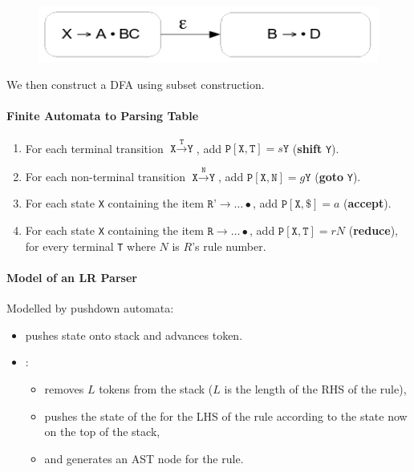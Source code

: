 \documentclass[twocolumn,english]{article}
\let\emph\relax
\begin{document}
\begin{figure}[H]
\centering{}\includegraphics[width=0.4\linewidth]{img/lr0tonfa-nonterminal}
\end{figure}

We then construct a DFA using subset construction.

\paragraph{Finite Automata to Parsing Table}
\begin{enumerate}
\item For each terminal transition $\texttt{X}\xrightarrow{\texttt{T}}\texttt{Y}$,
add $\texttt{P}[\texttt{X},\texttt{T}]=s\texttt{Y}$ (\textbf{shift}
\texttt{Y}).
\item For each non-terminal transition $\texttt{X}\xrightarrow{\texttt{N}}\texttt{Y}$,
add $\texttt{P}[\texttt{X},\texttt{N}]=g\texttt{Y}$ (\textbf{goto}
\texttt{Y}).
\item For each state \texttt{X} containing the item $\texttt{R'}\rightarrow\dots\bullet$,
add $\texttt{P}[\texttt{X},\texttt{\$}]=a$ (\textbf{accept}).
\item For each state \texttt{X} containing the item $\texttt{R}\rightarrow\dots\bullet$,
add $\texttt{P}[\texttt{X},\texttt{T}]=rN$ (\textbf{reduce}), for
every terminal \texttt{T} where $N$ is $R$'s rule number.
\end{enumerate}

\paragraph{Model of an LR Parser}

Modelled by pushdown automata:
\begin{itemize}
\item \emph{Shift} pushes state onto stack and advances token.
\item \emph{Reduce}:
\begin{itemize}
\item removes $L$ tokens from the stack ($L$ is the length of the RHS
of the rule), 
\item pushes the state of the \emph{goto} for the LHS of the rule according
to the state now on the top of the stack,
\item and generates an AST node for the rule.
\end{itemize}
\end{itemize}
\end{document}
